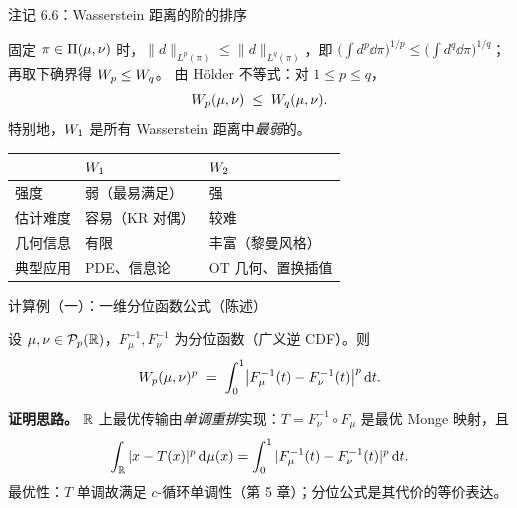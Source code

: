 \begin{frame}{注记 6.6：Wasserstein 距离的阶的排序}

   固定 $\pi\in\Pi(\mu,\nu)$ 时，$\|d\|_{L^{p}(\pi)}\le\|d\|_{L^{q}(\pi)}$，即 $\bigl(\int d^{p}\dd\pi\bigr)^{1/p}\le\bigl(\int d^{q}\dd\pi\bigr)^{1/q}$；再取下确界得 $W_{p}\le W_{q}$。
  由 Hölder 不等式：对 $1\le p\le q$，
  \[
    W_{p}(\mu,\nu) \;\le\; W_{q}(\mu,\nu).
  \]
  特别地，$W_{1}$ 是所有 Wasserstein 距离中\emph{最弱}的。

  {\centering\small
    \begin{tabular}{lll}
      \toprule
      & $W_{1}$ & $W_{2}$ \\
      \midrule
      强度 & 弱（最易满足） & 强 \\
      估计难度 & 容易（KR 对偶） & 较难 \\
      几何信息 & 有限 & 丰富（黎曼风格） \\
      典型应用 & PDE、信息论 & OT 几何、置换插值 \\
      \bottomrule
    \end{tabular}
  \par}

\end{frame}

\begin{frame}{计算例（一）：一维分位函数公式（陈述）}

  设 $\mu,\nu\in\mathcal{P}_{p}(\mathbb{R})$，$F_{\mu}^{-1},F_{\nu}^{-1}$ 为分位函数（广义逆 CDF）。则
  \[
    W_{p}(\mu,\nu)^{p}
    \;=\; \int_{0}^{1} \bigl|F_{\mu}^{-1}(t) - F_{\nu}^{-1}(t)\bigr|^{p}\,\mathrm{d} t.
  \]

  \textbf{证明思路。} $\mathbb{R}$ 上最优传输由\emph{单调重排}实现：$T=F_{\nu}^{-1}\circ F_{\mu}$ 是最优 Monge 映射，且
  \[
    \int_{\mathbb{R}} |x-T(x)|^{p}\,\mathrm{d}\mu(x)
    = \int_{0}^{1}|F_{\mu}^{-1}(t)-F_{\nu}^{-1}(t)|^{p}\,\mathrm{d} t.
  \]
  最优性：$T$ 单调故满足 $c$-循环单调性（第 5 章）；分位公式是其代价的等价表达。

\end{frame}

